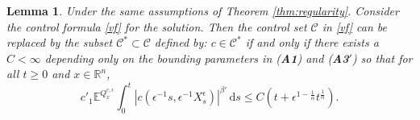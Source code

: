\documentclass[11pt,reqno]{amsart}
\newtheorem{lem}[thm]{Lemma}
\theoremstyle{definition}
\theoremstyle{remark}
\numberwithin{equation}{section}
\newcommand{\eps}{\epsilon}
\newcommand{\R}{{\mathbb{R}}}
\begin{document}
\begin{lem}\label{Cset}
Under the same assumptions of Theorem \ref{thm:regularity}. Consider the control formula \eqref{vf} for the solution. Then the control set $\mathscr{C}$ in \eqref{vf} can be replaced by the subset $\mathscr{C}^{\ast} \subset \mathscr{C}$ defined by: 
$c\in \mathscr{C}^*$ if and only if there exists a $C < \infty$ depending only on the bounding parameters in {\upshape({\bf A1})} and {\upshape ({\bf A3$'$})} so that for all $t\ge 0$ and $x\in \R^n$,
\begin{equation}\label{sCset}
c'_1 \mathbb{E}^{Q^{c,\epsilon}_{x}} \int_0^t|c(\eps^{-1}s,\eps^{-1}X^\eps_s)|^{\beta'}\,\mathrm{d}s  \leq C(t + \epsilon^{1-\frac{1}{\alpha}} t^{\frac{1}{\alpha}}).
\end{equation}
\end{lem}
\end{document}
